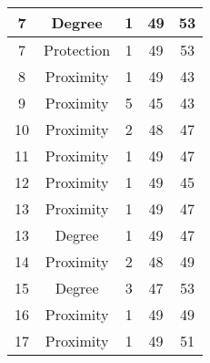 \documentclass[results.tex]{subfiles}
\begin{document}
\begin{center}
\begin{tabular}{| c || c | c | c | c |}
            \hline
            7                       & Degree                       & 1                      & 49                      & 53                   \\
            \hline
            7                       & Protection                   & 1                      & 49                      & 53                   \\
            \hline
            8                       & Proximity                    & 1                      & 49                      & 43                   \\
            \hline
            9                       & Proximity                    & 5                      & 45                      & 43                   \\
            \hline
            10                      & Proximity                    & 2                      & 48                      & 47                   \\
            \hline
            11                      & Proximity                    & 1                      & 49                      & 47                   \\
            \hline
            12                      & Proximity                    & 1                      & 49                      & 45                   \\
            \hline
            13                      & Proximity                    & 1                      & 49                      & 47                   \\
            \hline
            13                      & Degree                       & 1                      & 49                      & 47                   \\
            \hline
            14                      & Proximity                    & 2                      & 48                      & 49                   \\
            \hline
            15                      & Degree                       & 3                      & 47                      & 53                   \\
            \hline
            16                      & Proximity                    & 1                      & 49                      & 49                   \\
            \hline
            17                      & Proximity                    & 1                      & 49                      & 51                   \\

\end{tabular}
\end{center}
\end{document}
